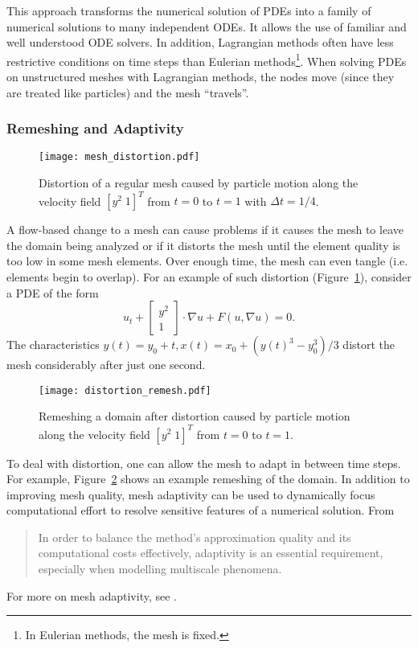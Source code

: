 \documentclass[letterpaper,10pt]{article}
\theoremstyle{definition}
\begin{document}
This approach transforms the numerical solution of PDEs into a family of
numerical solutions to many independent ODEs. It allows the use of familiar
and well understood ODE solvers. In addition, Lagrangian methods often
have less restrictive conditions on time steps than Eulerian
methods\footnote{In Eulerian methods, the mesh is fixed.}.
When solving PDEs on unstructured meshes
with Lagrangian methods, the nodes move (since they
are treated like particles) and the mesh ``travels''.

\subsubsection{Remeshing and Adaptivity}

\begin{figure}
  \texttt{[image: mesh\_distortion.pdf]}
  \centering
  \captionsetup{width=.75\linewidth}
  \caption{Distortion of a regular mesh caused by particle motion along
    the velocity field \(\left[ y^2 \; 1 \right]^T\) from \(t = 0\)
    to \(t = 1\) with \(\Delta t = 1/4\).}
  \label{fig:mesh-distortion}
\end{figure}

A flow-based change to a mesh can cause problems if it causes the mesh to
leave the domain being analyzed or if it distorts the mesh until the element
quality is too low in some mesh elements. Over enough time, the mesh can
even tangle (i.e. elements begin to overlap).
For an example of such distortion (Figure~\ref{fig:mesh-distortion}),
consider a PDE of the form
\begin{equation}\label{eq:non-rigid-characteristics}
u_t + \left[ \begin{array}{c} y^2 \\ 1 \end{array}\right] \cdot \nabla u +
  F\left(u, \nabla u\right) = 0.
\end{equation}
The characteristics \(y(t) = y_0 + t, x(t) = x_0 +
\left(y(t)^3 - y_0^3\right)/3\)
distort the mesh considerably after just one second.

\begin{figure}
  \texttt{[image: distortion\_remesh.pdf]}
  \centering
  \captionsetup{width=.75\linewidth}
  \caption{Remeshing a domain after distortion caused by particle motion
    along the velocity field \(\left[ y^2 \; 1 \right]^T\) from \(t = 0\)
    to \(t = 1\).}
  \label{fig:distortion-remesh}
\end{figure}

To deal with distortion, one can allow the mesh to adapt in between time
steps. For example, Figure~\ref{fig:distortion-remesh} shows an example
remeshing of the domain.
In addition to improving mesh quality, mesh
adaptivity can be used to dynamically focus computational effort to resolve
sensitive features of a numerical solution. From \cite{Iske2004}
\begin{quote}
{\small In order to balance the method's approximation quality and its
computational costs effectively, adaptivity is an essential requirement,
especially when modelling multiscale phenomena.}
\end{quote}
For more on mesh adaptivity, see \cite{Babuska1978, Peraire1987, Pain2001}.
\end{document}
